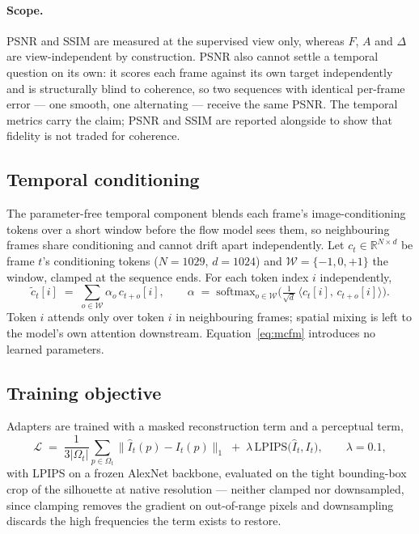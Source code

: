 \paragraph{Scope.} PSNR and SSIM are measured at the supervised view only, whereas
$F$, $A$ and $\Delta$ are view-independent by construction. PSNR also cannot settle a
temporal question on its own: it scores each frame against its own target
independently and is structurally blind to coherence, so two sequences with identical
per-frame error --- one smooth, one alternating --- receive the same PSNR. The
temporal metrics carry the claim; PSNR and SSIM are reported alongside to show that
fidelity is not traded for coherence.

\subsection{Temporal conditioning}

The parameter-free temporal component blends each frame's image-conditioning tokens
over a short window before the flow model sees them, so neighbouring frames share
conditioning and cannot drift apart independently. Let $c_t \in \mathbb{R}^{N \times d}$
be frame $t$'s conditioning tokens ($N = 1029$, $d = 1024$) and
$\mathcal{W} = \{-1, 0, +1\}$ the window, clamped at the sequence ends. For each token
index $i$ independently,
\begin{equation}
  \tilde{c}_t[i] \;=\; \sum_{o \in \mathcal{W}} \alpha_o \, c_{t+o}[i],
  \qquad
  \alpha \;=\; \mathrm{softmax}_{o \in \mathcal{W}}
    \Big( \tfrac{1}{\sqrt{d}}\, \langle c_t[i],\, c_{t+o}[i] \rangle \Big).
  \label{eq:mcfm}
\end{equation}
Token $i$ attends only over token $i$ in neighbouring frames; spatial mixing is left to
the model's own attention downstream. Equation~\eqref{eq:mcfm} introduces no learned
parameters.

\subsection{Training objective}

Adapters are trained with a masked reconstruction term and a perceptual term,
\begin{equation}
  \mathcal{L} \;=\; \frac{1}{3|\Omega_t|}\sum_{p \in \Omega_t}
      \big\| \hat{I}_t(p) - I_t(p) \big\|_1
    \;+\; \lambda \, \mathrm{LPIPS}\big(\hat{I}_t, I_t\big),
  \qquad \lambda = 0.1,
  \label{eq:loss}
\end{equation}
with LPIPS on a frozen AlexNet backbone, evaluated on the tight bounding-box crop of
the silhouette at native resolution --- neither clamped nor downsampled, since
clamping removes the gradient on out-of-range pixels and downsampling discards the
high frequencies the term exists to restore.

